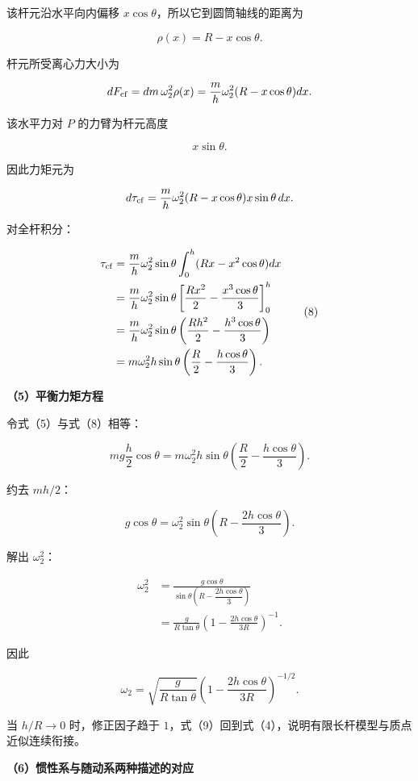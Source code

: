 \documentclass[12pt,a4paper,UTF8]{ctexart}
\begin{document}
该杆元沿水平向内偏移 \(x\cos\theta\)，所以它到圆筒轴线的距离为

\[
\rho(x)=R-x\cos\theta.\tag{7}
\]

杆元所受离心力大小为

\[
dF_{\rm cf}=dm\,\omega_2^2\rho(x)
=\frac mh\omega_2^2(R-x\cos\theta)dx.
\]

该水平力对 \(P\) 的力臂为杆元高度

\[
x\sin\theta.
\]

因此力矩元为

\[
d\tau_{\rm cf}
=\frac mh\omega_2^2(R-x\cos\theta)x\sin\theta\,dx.
\]

对全杆积分：

\[
\begin{aligned}
\tau_{\rm cf}
&=\frac mh\omega_2^2\sin\theta
\int_0^h(Rx-x^2\cos\theta)dx\\
&=\frac mh\omega_2^2\sin\theta
\left[
\frac{Rx^2}{2}-\frac{x^3\cos\theta}{3}
\right]_0^h\\
&=\frac mh\omega_2^2\sin\theta
\left(
\frac{Rh^2}{2}-\frac{h^3\cos\theta}{3}
\right)\\
&=m\omega_2^2h\sin\theta
\left(
\frac R2-\frac{h\cos\theta}{3}
\right).
\end{aligned}\tag{8}
\]

\textbf{（5）平衡力矩方程}

令式（5）与式（8）相等：

\[
mg\frac h2\cos\theta
=m\omega_2^2h\sin\theta
\left(
\frac R2-\frac{h\cos\theta}{3}
\right).
\]

约去 \(mh/2\)：

\[
g\cos\theta
=\omega_2^2\sin\theta
\left(R-\frac{2h\cos\theta}{3}\right).
\]

解出 \(\omega_2^2\)：

\[
\begin{aligned}
\omega_2^2
&=\frac{g\cos\theta}
{\sin\theta\left(R-\dfrac{2h\cos\theta}{3}\right)}\\
&=\frac{g}{R\tan\theta}
\left(1-\frac{2h\cos\theta}{3R}\right)^{-1}.
\end{aligned}
\]

因此

\[
\boxed{
\omega_2
=\sqrt{\frac{g}{R\tan\theta}}
\left(1-\frac{2h\cos\theta}{3R}\right)^{-1/2}
}.\tag{9}
\]

当 \(h/R\to0\) 时，修正因子趋于
\(1\)，式（9）回到式（4），说明有限长杆模型与质点近似连续衔接。

\textbf{（6）惯性系与随动系两种描述的对应}
\end{document}

